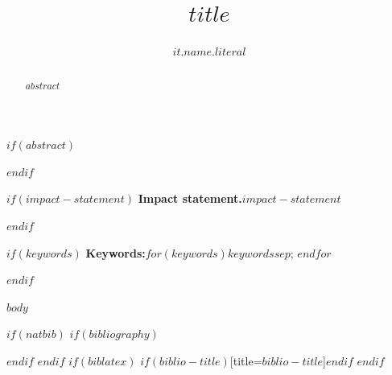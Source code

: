 \documentclass[$if(fontsize)$$fontsize$$else$9pt$endif$$if(linenumbers)$,lineno$endif$$if(linespacing)$,$linespacing$$endif$]{elife}
\title{$title$}
\author[$for(it.affiliations)$$it.number$$sep$,$endfor$$if(it.attributes.corresponding)$*$endif$]{$it.name.literal$}
\affil[$it.number$]{$it.name$$if(it.department)$, $it.department$$endif$$if(it.city)$, $it.city$$endif$$if(it.country)$, $it.country$$endif$}
\begin{document}
\maketitle

$if(abstract)$
\begin{abstract}
$abstract$
\end{abstract}
$endif$

$if(impact-statement)$
\noindent\textbf{Impact statement.}\space $impact-statement$\par\medskip
$endif$

$if(keywords)$
\noindent\textbf{Keywords:}\space $for(keywords)$$keywords$$sep$; $endfor$\par\medskip
$endif$

$body$

$if(natbib)$
$if(bibliography)$

$endif$
$endif$
$if(biblatex)$
\printbibliography$if(biblio-title)$[title=$biblio-title$]$endif$
$endif$
\end{document}

